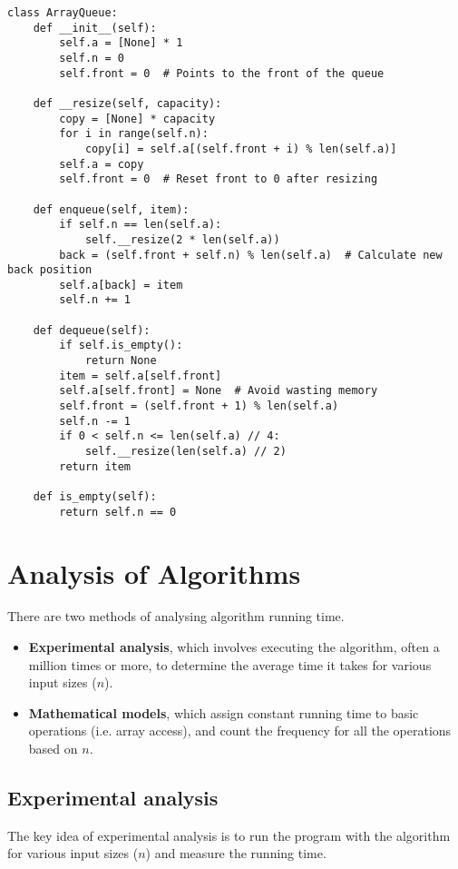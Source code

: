 \documentclass{article}
\begin{document}
\begin{verbatim}
class ArrayQueue:
    def __init__(self):
        self.a = [None] * 1
        self.n = 0
        self.front = 0  # Points to the front of the queue

    def __resize(self, capacity):
        copy = [None] * capacity
        for i in range(self.n):
            copy[i] = self.a[(self.front + i) % len(self.a)]
        self.a = copy
        self.front = 0  # Reset front to 0 after resizing

    def enqueue(self, item):
        if self.n == len(self.a):
            self.__resize(2 * len(self.a))
        back = (self.front + self.n) % len(self.a)  # Calculate new back position
        self.a[back] = item
        self.n += 1
        
    def dequeue(self):
        if self.is_empty():
            return None
        item = self.a[self.front]
        self.a[self.front] = None  # Avoid wasting memory
        self.front = (self.front + 1) % len(self.a)
        self.n -= 1
        if 0 < self.n <= len(self.a) // 4:
            self.__resize(len(self.a) // 2)
        return item

    def is_empty(self):
        return self.n == 0

\end{verbatim}

\section{Analysis of Algorithms}

There are two methods of analysing algorithm running time. 

\begin{itemize}
 \item \textbf{Experimental analysis}, which involves executing the algorithm, often a million times or more, to determine the average time it takes for various input sizes ($n$).
 \item \textbf{Mathematical models}, which assign constant running time to basic operations (i.e. array access), and count the frequency for all the operations based on $n$.
\end{itemize}

\subsection{Experimental analysis}

The key idea of experimental analysis is to run the program with the algorithm for various input sizes ($n$) and measure the running time. 
\end{document}

